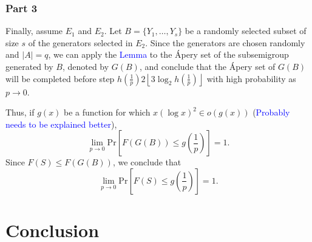 \subsubsection*{Part 3}

\par Finally, assume $E_1$ and $E_2$. Let $B = \{Y_{1}, \ldots, Y_{s}\}$ be a randomly selected subset of size $s$ of the generators selected in $E_2$.  Since the generators are chosen randomly and $|A| = q$, we can apply the \textcolor{blue}{Lemma} to the Ápery set of the subsemigroup generated by $B$, denoted by $G(B)$, and conclude that the Ápery set of $G(B)$ will be completed before step $h\left(\frac{1}{p}\right)2\left\lfloor 3\log_2 h\left(\frac{1}{p}\right)\right\rfloor$ with high probability as $p \to 0$. 
\par Thus, if $g(x)$ be a function for which $x(\log x)^2 \in o(g(x))$ (\textcolor{blue}{Probably needs to be explained better}),
\[\lim_{p \to  0} \text{Pr}\left[F(G(B)) \leq g\left(\frac{1}{p}\right)\right] = 1.\]
Since $F(S) \leq F(G(B))$, we conclude that
\[\lim_{p \to 0}\text{Pr}\left[F(S) \leq g\left(\frac{1}{p}\right)\right] = 1.\] 


\section{Conclusion}
